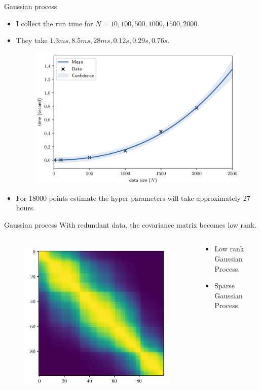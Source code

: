 \documentclass{beamer}
\begin{document}
\begin{frame}{Gaussian process}
\begin{itemize}
	\item I collect the run time for $N = {10, 100, 500, 1000, 1500, 2000}$.
	\item They take $1.3ms, 8.5ms, 28ms, 0.12s, 0.29s, 0.76s$.

	\begin{figure}
		\centering
		\includegraphics[width=0.5\linewidth]{images/figure_12}
		\label{fig:figure11}
	\end{figure}

	\item For 18000 points estimate the hyper-parameters will take approximately 27 hours.
\end{itemize}	
\end{frame}

\begin{frame}{Gaussian process}
	With redundant data, the covariance matrix becomes low rank.	
	\begin{columns}
		\begin{column}{0.5\textwidth}
			\begin{figure}
				\centering
				\includegraphics[width=0.8\linewidth]{images/figure_13}
				\label{fig:figure11}
			\end{figure}	
		\end{column}
		\begin{column}{0.5\textwidth}
			\begin{itemize}[<+->]
				\item Low rank Gaussian Process.
				\item Sparse Gaussian Process.
			\end{itemize}
		\end{column}
\end{columns}
\end{frame}
\end{document}
